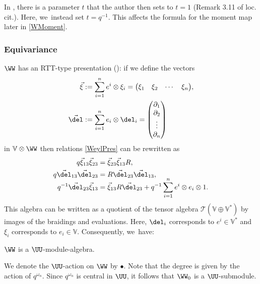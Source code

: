 \begin{rem}
In \cite{JordanMult}, there is a parameter $t$ that the author then sets to $t=1$ (\cf Remark 3.11 of loc.\,cit.).
Here, we~instead set $t=q^{-1}$.
This affects the formula for the moment map later in \ref{WMoment}.
\end{rem}

\subsubsection{Equivariance}
$\WW$ has an RTT-type presentation (\cf \cite[Ex.\,4.9]{JordanMult}): if we define the vectors
\begin{align*}
\vec{\xi}&:= \sum_{i=1}^n e^i\otimes \xi_i
=
\begin{pmatrix}
\xi_1 & \xi_2 & \cdots & \xi_n
\end{pmatrix}\!,
\\
\vec{\del}&:=\sum_{i=1}^ne_i\otimes \del_i
=
\begin{pmatrix}
\partial_1\\
\partial_2\\
\vdots\\
\partial_n
\end{pmatrix}
\end{align*}
in $\mathbb{V}\otimes\WW$ then relations \eqref{WeylPres} can be rewritten as
\begin{equation*}
\begin{aligned}
q\vec{\xi}_{13}\vec{\xi}_{23}&=\vec{\xi}_{23}\vec{\xi}_{13}R,\\
q\vec{\del}_{13}\vec{\del}_{23}&=R\vec{\del}_{23}\vec{\del}_{13},\\[-6pt]
q^{-1}\vec{\del}_{23}\vec{\xi}_{13}&=\vec{\xi}_{13}R\vec{\del}_{23}+q^{-1}\sum_{i=1}^n e^i\otimes e_i\otimes 1.
\end{aligned}
\end{equation*}
This algebra can be written as a quotient of the tensor algebra $\mathcal{T}(\mathbb{V}\oplus\mathbb{V}^*)$ by images of the braidings and evaluations.
Here, $\del_i$ corresponds to $e^i\in\mathbb{V}^*$ and $\xi_i$ corresponds to $e_i\in\mathbb{V}$.
Consequently, we~have:
\begin{prop}\label{WeylEquiv}
$\WW$ is a $\UU$-module-algebra.
\end{prop}
We denote the $\UU$-action on $\WW$ by $\bullet$.
Note that the degree is given by the action of $q^{\omega_n}$.
Since $q^{\omega_n}$ is central in $\UU$, it follows that $\WW_0$ is a $\UU$-submodule.

